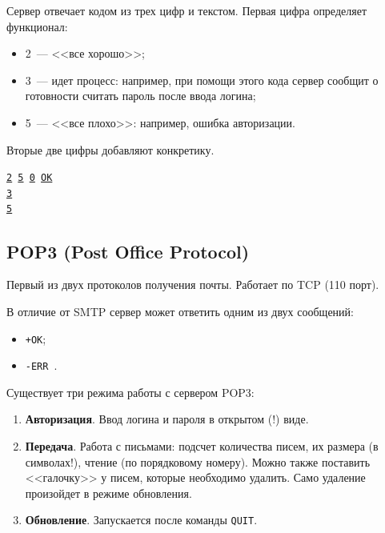 Сервер отвечает кодом из трех цифр и текстом. Первая цифра определяет функционал:

\begin{itemize}
    \item 2~--- <<все хорошо>>;
    \item 3~--- идет процесс: например, при помощи этого кода сервер сообщит о готовности считать пароль после ввода логина;
    \item 5~--- <<все плохо>>: например, ошибка авторизации.
\end{itemize}

Вторые две цифры добавляют конкретику.

\begin{center}
    \texttt{\underline{2}\,\underline{5}\,\underline{0} \underline{OK}}\\
    \texttt{\underline{3}\,\underline{\phantom{5}}\,\underline{\phantom{5}} \underline{\phantom{OK}}}\\
    \texttt{\underline{5}\,\underline{\phantom{5}}\,\underline{\phantom{5}} \underline{\phantom{OK}}}
\end{center}

\subsection{POP3 (Post Office Protocol)}

Первый из двух протоколов получения почты. Работает по TCP (110 порт).

В отличие от SMTP сервер может ответить одним из двух сообщений:

\begin{itemize}
    \item \texttt{+OK};
    \item \texttt{-ERR \underline{\phantom{reason}}}.
\end{itemize}

Существует три режима работы с сервером POP3:

\begin{enumerate}
    \item \textbf{Авторизация}. Ввод логина и пароля в открытом (!) виде.
    \item \textbf{Передача}. Работа с письмами: подсчет количества писем, их размера (в символах!), чтение (по порядковому номеру). Можно также поставить <<галочку>> у писем, которые необходимо удалить. Само удаление произойдет в режиме обновления.
    \item \textbf{Обновление}. Запускается после команды \texttt{QUIT}.
\end{enumerate}

